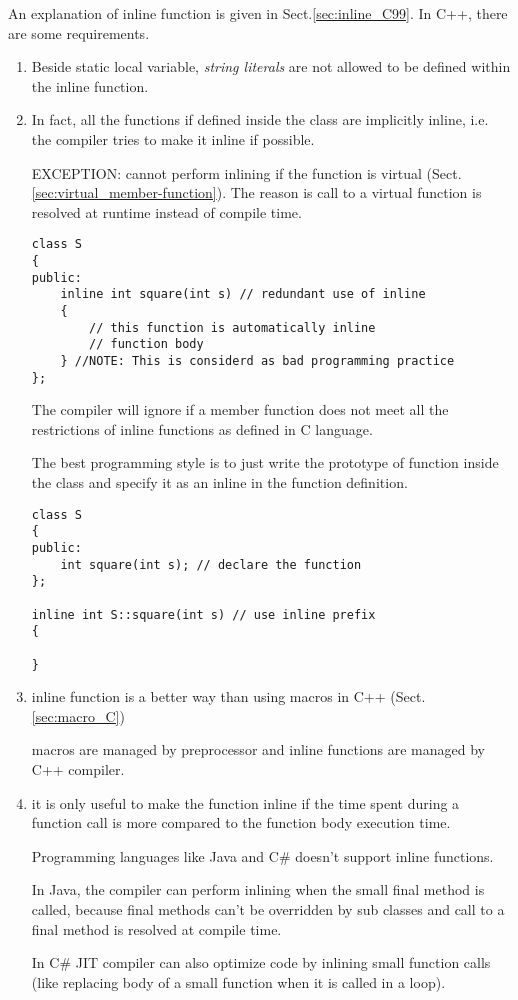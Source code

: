 An explanation of inline function is given in Sect.\ref{sec:inline_C99}. In
C++, there are some requirements.
\begin{enumerate}
  \item Beside static local variable, {\it string literals} are not allowed to
  be defined within the inline function.
  
  \item  In fact, all the functions if defined inside the class are implicitly inline, i.e. 
  the compiler tries to make it inline if possible.

EXCEPTION: cannot perform inlining if the function is virtual (Sect.\ref{sec:virtual_member-function}). The reason is
call to a virtual function is resolved at runtime instead of compile time.


\begin{lstlisting}
class S 
{ 
public: 
    inline int square(int s) // redundant use of inline 
    { 
        // this function is automatically inline 
        // function body 
    } //NOTE: This is considerd as bad programming practice
};
\end{lstlisting}
  The compiler will ignore if a member function does not meet all the
  restrictions of inline functions as defined in C language.
   
  The best programming style is to just write the prototype of function inside
  the class and specify it as an inline in the function definition.

\begin{lstlisting}
class S 
{ 
public: 
    int square(int s); // declare the function 
}; 
  
inline int S::square(int s) // use inline prefix 
{ 
  
}
\end{lstlisting}   
   
   \item inline function is a better way than using macros in C++ (Sect.\ref{sec:macro_C})
   
   macros are managed by preprocessor and inline functions are managed by C++ compiler.
   
   \item  it is only useful to make the function inline if the time spent during
   a function call is more compared to the function body execution time.
   
   Programming languages like Java and C\# doesn’t support inline functions.
   
   In Java, the compiler can perform inlining when the small final method is
   called, because final methods can’t be overridden by sub classes and call to
   a final method is resolved at compile time.
   
    In C\# JIT compiler can also optimize code by inlining small function calls
    (like replacing body of a small function when it is called in a loop).
    
   
\end{enumerate}

